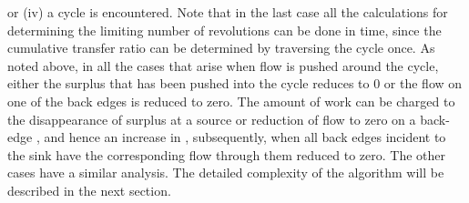 \documentclass[11pt]{article}
\begin{document}
or (iv) a cycle is encountered. 
Note that in the last case all the calculations for 
determining the limiting number of
revolutions can be done in  time, since the cumulative transfer ratio can be 
determined by traversing the cycle once. As noted above, in all the cases
that arise when flow is pushed around the cycle,
either the surplus that has been pushed into the cycle reduces to 0 or the flow on one of the back edges is reduced to zero. The 
amount of work can be charged to the disappearance 
of surplus at a source or reduction of flow to zero on a back-edge ,
and hence an
increase in  , subsequently, when all back edges incident to
the sink  have the corresponding flow through them reduced to zero.
The other cases have a similar analysis.
The detailed complexity of the algorithm will be described in the next section.
\end{document}
